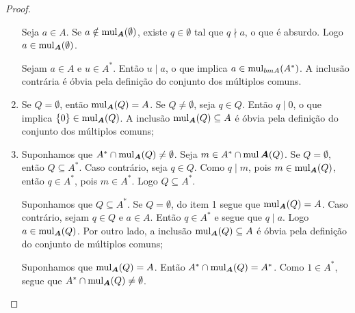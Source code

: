 \begin{proof}
\begin{enumerate}
	Seja $a \in A$. Se $a \notin \operatorname{mul}_{\bm A}(\emptyset)$, existe $q \in \emptyset$ tal que $q \nmid a$, o que é absurdo. Logo $a \in \operatorname{mul}_{\bm A}(\emptyset)$.

	Sejam $a \in A$ e $u \in A^*$. Então $u \mid a$, o que implica $a \in \operatorname{mul}_{\\bm A}(A^*)$. A inclusão contrária é óbvia pela definição do conjunto dos múltiplos comuns.

	\item Se $Q = \emptyset$, então $\operatorname{mul}_{\bm A}(Q) = A$. Se $Q \neq \emptyset$, seja $q \in Q$. Então $q \mid 0$, o que implica $\{0\} \in \operatorname{mul}_{\bm A}(Q)$. A inclusão $\operatorname{mul}_{\bm A}(Q) \subseteq A$ é óbvia pela definição do conjunto dos múltiplos comuns;

	\item Suponhamos que $A^* \cap \operatorname{mul}_{\bm A}(Q) \neq \emptyset$. Seja $m \in A^* \cap \operatorname{mul}{\bm A}(Q)$. Se $Q = \emptyset$, então $Q \subseteq A^*$. Caso contrário, seja $q \in Q$. Como $q \mid m$, pois $m \in \operatorname{mul}_{\bm A}(Q)$, então $q \in A^*$, pois $m \in A^*$. Logo $Q \subseteq A^*$.

	Suponhamos que $Q \subseteq A^*$. Se $Q = \emptyset$, do item 1 segue que $\operatorname{mul}_{\bm A}(Q)=A$. Caso contrário, sejam $q \in Q$ e $a \in A$. Então $q \in A^*$ e segue que $q \mid a$. Logo $a \in \operatorname{mul}_{\bm A}(Q)$. Por outro lado, a  inclusão $\operatorname{mul}_{\bm A}(Q) \subseteq A$ é óbvia pela definição do conjunto de múltiplos comuns;

	Suponhamos que $\operatorname{mul}_{\bm A}(Q) = A$. Então $A^* \cap \operatorname{mul}_{\bm A}(Q) = A^*$. Como $1 \in A^*$, segue que $A^* \cap \operatorname{mul}_{\bm A}(Q) \neq \emptyset$.
	\end{enumerate}
\end{proof}



